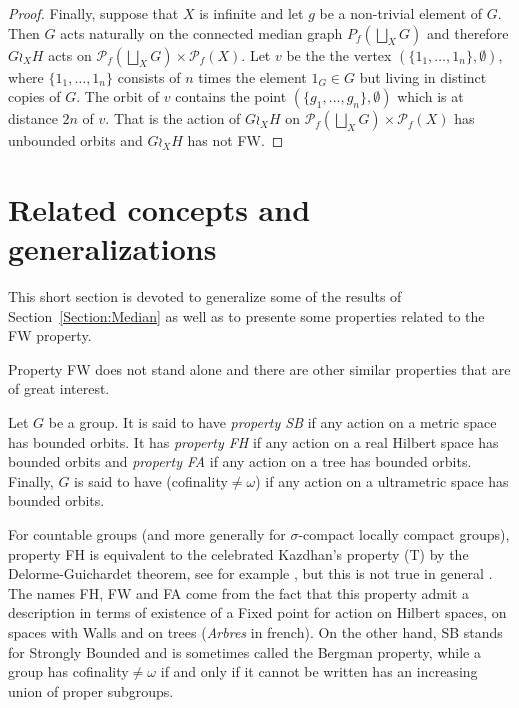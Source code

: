 \begin{lem}
\begin{proof}
Finally, suppose that $X$ is infinite and let $g$ be a non-trivial element of $G$.
Then $G$ acts naturally on the connected median graph $P_f(\bigsqcup_XG)$ and therefore $G\wr_X H$ acts on $\mathcal P_f(\bigsqcup_XG)\times \mathcal P_f(X)$.
Let $v$ be the the vertex $(\{1_1,\dots, 1_n\},\emptyset)$, where $\{1_1,\dots, 1_n\}$ consists of $n$ times the element $1_G\in G$ but living in distinct copies of $G$.
The orbit of $v$ contains the point $(\{g_1,\dots, g_n\},\emptyset)$ which is at distance $2n$ of $v$.
That is the action of $G\wr_X H$ on $\mathcal P_f(\bigsqcup_XG)\times \mathcal P_f(X)$ has unbounded orbits and $G\wr_X H$ has not FW.
\end{proof}






\section{Related concepts and generalizations}\label{Section:Generalizations}
This short section is devoted to generalize some of the results of Section~\ref{Section:Median} as well as to presente some properties related to the FW property.

Property FW does not stand alone and there are other similar properties that are of great interest.
\begin{defn}\label{Def:FHFA}
Let $G$ be a group.
It is said to have \emph{property SB} if any action on a metric space has bounded orbits.
It has \emph{property FH} if any action on a real Hilbert space has bounded orbits and \emph{property FA} if any action on a tree has bounded orbits.
Finally, $G$ is said to have (cofinality$\neq\omega$) if any action on a ultrametric space has bounded orbits.
\end{defn}
For countable groups (and more generally for $\sigma$-compact locally compact groups), property FH is equivalent to the celebrated Kazdhan's property (T) by the Delorme-Guichardet theorem, see for example \cite{MR2415834}, but this is not true in general \cite{MR2240370}.
The names FH, FW and FA come from the fact that this property admit a description in terms of existence of a Fixed point for action on Hilbert spaces, on spaces with Walls and on trees (\emph{Arbres} in french).
On the other hand, SB stands for Strongly Bounded and is sometimes called the Bergman property, while a group has cofinality$\neq\omega$ if and only if it cannot be written has an increasing union of proper subgroups.


\end{lem}
